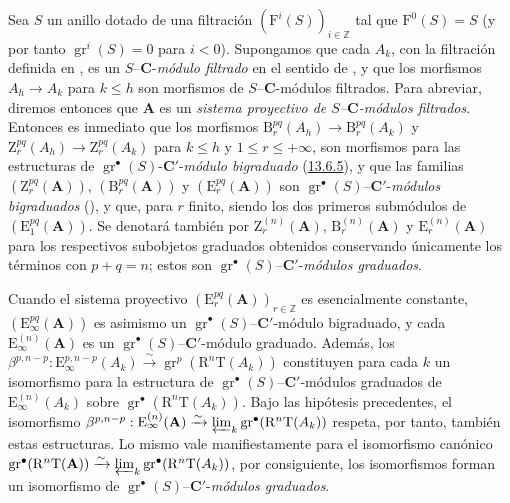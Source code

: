 \begin{env}[13.7.6]
\label{0.13.7.6}
\label{0.13.7.6-fr}
Sea $S$ un anillo dotado de una filtración
$(\mathrm F^i(S))_{i\in\mathbb Z}$ tal que
$\mathrm F^0(S)=S$ (y por tanto
$\operatorname{gr}^i(S)=0$ para $i<0$).
Supongamos que cada $A_k$, con la filtración definida en
, es un
$S$--$\boldsymbol{C}$-\emph{módulo filtrado} en el sentido de , y que los
morfismos $A_h\to A_k$ para $k\leq h$ son morfismos de
$S$--$\boldsymbol{C}$-módulos filtrados.
Para abreviar, diremos entonces que $\mathbf A$ es un
\emph{sistema proyectivo de $S$--$\boldsymbol{C}$-módulos filtrados}. Entonces es inmediato que los morfismos $\mathrm B_r^{pq}(A_h)\to\mathrm B_r^{pq}(A_k)$ y $\mathrm Z_r^{pq}(A_h)\to\mathrm Z_r^{pq}(A_k)$ para $k\leq h$ y
$1\leq r\leq+\infty$, son morfismos para las estructuras de $\operatorname{gr}^\bullet(S)$-$\boldsymbol{C}'$-\emph{módulo bigraduado} (\hyperref[0.13.6.5-fr]{13.6.5}), y que las familias $(\mathrm Z_r^{pq}(\mathbf A))$, $(\mathrm B_r^{pq}(\mathbf A))$ y $(\mathrm E_r^{pq}(\mathbf A))$ son $\operatorname{gr}^\bullet(S)$--$\boldsymbol{C}'$-\emph{módulos bigraduados}
(), y que, para $r$ finito, siendo los dos primeros submódulos de $(\mathrm E_1^{pq}(\mathbf A))$. Se denotará también por $\mathrm Z_r^{(n)}(\mathbf A)$,
$\mathrm B_r^{(n)}(\mathbf A)$ y
$\mathrm E_r^{(n)}(\mathbf A)$ para los respectivos subobjetos graduados
obtenidos conservando únicamente los términos con $p+q=n$; estos son
$\operatorname{gr}^\bullet(S)$--$\boldsymbol{C}'$-\emph{módulos graduados}.

Cuando el sistema proyectivo
$(\mathrm E_r^{pq}(\mathbf A))_{r\in\mathbb Z}$ es esencialmente constante,
$(\mathrm E_\infty^{pq}(\mathbf A))$ es asimismo un
$\operatorname{gr}^\bullet(S)$--$\boldsymbol{C}'$-módulo bigraduado, y cada
$\mathrm E_\infty^{(n)}(\mathbf A)$ es un
$\operatorname{gr}^\bullet(S)$--$\boldsymbol{C}'$-módulo graduado. Además, los $\beta^{p,n-p}:\mathrm E_\infty^{p,n-p}(A_k)\xrightarrow{\sim}
\operatorname{gr}^p(\mathrm R^n\mathrm T(A_k))$ constituyen para cada $k$ un isomorfismo para la estructura de $\operatorname{gr}^\bullet(S)$--$\boldsymbol{C}'$-módulos graduados de
$\mathrm E_\infty^{(n)}(A_k)$ sobre
$\operatorname{gr}^\bullet(\mathrm R^n\mathrm T(A_k))$.
Bajo las hipótesis precedentes, el isomorfismo
$\beta^{p,n-p}:\mathrm E_\infty^{(n)}(\mathbf A)\xrightarrow{\sim}
\varprojlim_k\operatorname{gr}^\bullet(\mathrm R^n\mathrm T(A_k))$
respeta, por tanto, también estas estructuras.
Lo mismo vale manifiestamente para el isomorfismo canónico
$\operatorname{gr}^\bullet(\mathrm R^n\mathrm T(\mathbf A))
\xrightarrow{\sim}
\varprojlim_k\operatorname{gr}^\bullet(\mathrm R^n\mathrm T(A_k))$,
por consiguiente, los isomorfismos  forman un
isomorfismo de
$\operatorname{gr}^\bullet(S)$--$\boldsymbol{C}'$-\emph{módulos graduados}.
\end{env}

